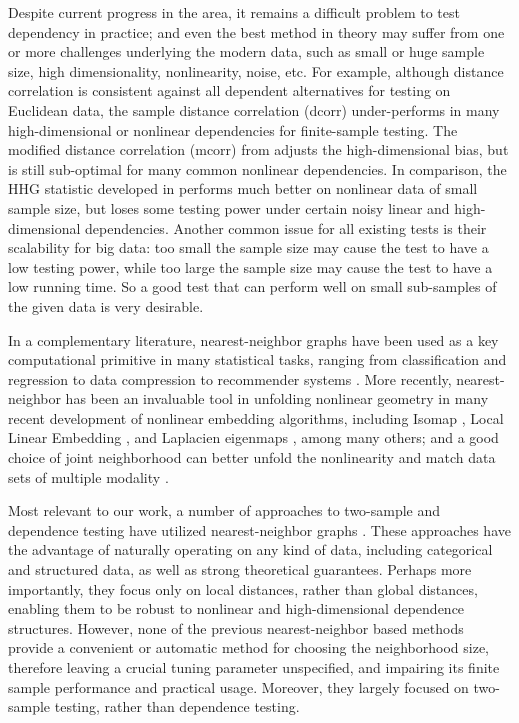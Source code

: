 \documentclass[11pt]{article}
\begin{document}
Despite current progress in the area, it remains a difficult problem to test dependency in practice; and even the best method in theory may suffer from one or more challenges underlying the modern data, such as small or huge sample size, high dimensionality, nonlinearity, noise, etc. For example, although distance correlation is consistent against all dependent alternatives for testing on Euclidean data, the sample distance correlation (dcorr) under-performs in many high-dimensional or nonlinear dependencies for finite-sample testing. The modified distance correlation (mcorr) from \cite{SzekelyRizzo2013a} adjusts the high-dimensional bias, but is still sub-optimal for many common nonlinear dependencies. In comparison, the HHG statistic developed in \cite{HellerGorfine2013} performs much better on nonlinear data of small sample size, but loses some testing power under certain noisy linear and high-dimensional dependencies. Another common issue for all existing tests is their scalability for big data: too small the sample size may cause the test to have a low testing power, while too large the sample size may cause the test to have a low running time. So a good test that can perform well on small sub-samples of the given data is very desirable.

In a complementary literature, nearest-neighbor graphs have been used as a key computational primitive in many statistical tasks, ranging from classification and regression \cite{Stone1977} to data compression to recommender systems \cite{Sarwar2000}. 
More recently, nearest-neighbor has been an invaluable tool in unfolding nonlinear geometry in many recent development of nonlinear embedding algorithms, including Isomap \cite{TenenbaumSilvaLangford2000, SilvaTenenbaum2003}, Local Linear Embedding \cite{SaulRoweis2000, RoweisSaul2003}, and Laplacien eigenmaps \cite{BelkinNiyogi2003}, among many others; and a good choice of joint neighborhood can better unfold the nonlinearity and match data sets of multiple modality \cite{ShenVogelsteinPriebe2016}.

Most relevant to our work, a number of approaches to two-sample and dependence testing have utilized nearest-neighbor graphs \cite{David1966,Friedman1983,Schilling1986,Dumcke2014}.  These approaches have the advantage of naturally operating on any kind of data, including categorical and structured data, as well as strong theoretical guarantees.  Perhaps more importantly, they focus only on local distances, rather than global distances, enabling them to be robust to nonlinear and high-dimensional dependence structures.  However, none of the previous nearest-neighbor based methods provide a convenient or automatic method for choosing the neighborhood size, therefore leaving a crucial tuning parameter unspecified, and impairing its finite sample performance and practical usage. Moreover, they largely focused on two-sample testing, rather than dependence testing.  
\end{document}
